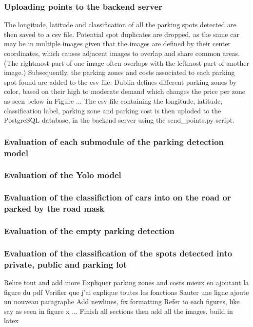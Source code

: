 \subsubsection{Uploading points to the backend server}
The longitude, latitude and classification of all the parking spots detected are then saved to a csv file.
Potential spot duplicates are dropped, as the same car may be in multiple images given that the images are defined by their center coordinates, which causes adjacent images to overlap and share common areas. (The rightmost part of one image often overlaps with the leftmost part of another image.)
Subsequently, the parking zones and costs associated to each parking spot found are added to the csv file.
Dublin defines different parking zones by color, based on their high to moderate demand which changes the price per zone as seen below in Figure ...
The csv file containing the longitude, latitude, classification label, parking zone and parking cost is then uploded to the PostgreSQL database, in the backend server using the send_points.py script.

\subsubsection{Evaluation of each submodule of the parking detection model}

\subsubsection{Evaluation of the Yolo model}

\subsubsection{Evaluation of the classifiction of cars into on the road or parked by the road mask}

\subsubsection{Evaluation of the empty parking detection}

\subsubsection{Evaluation of the classification of the spots detected into private, public and parking lot}


Relire tout and add more
Expliquer parking zones and costs mieux en ajoutant la figure du pdf
Verifier que j'ai explique toutes les fonctions
Sauter une ligne ajoute un nouveau paragraphe
Add newlines, fix formatting
Refer to each figures, like say as seen in figure x ...
Finish all sections then add all the images, build in latex